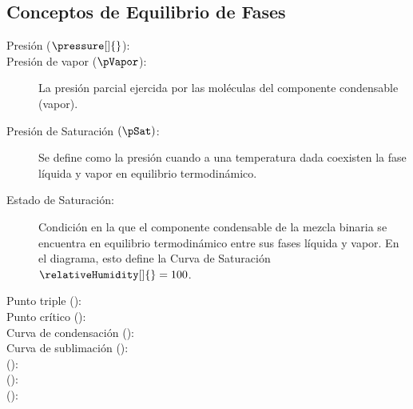 \subsection{Conceptos de Equilibrio de Fases}
    \begin{description}
        \item[Presión (${\pressure[]{}}$):] 
        \item[Presión de vapor ($\pVapor$):] La presión parcial ejercida por las moléculas del componente condensable (vapor).
        \item[Presión de Saturación $(\pSat)$:] Se define como la presión cuando a una temperatura dada coexisten la fase líquida y vapor en equilibrio termodinámico. 
        \item[Estado de Saturación:] Condición en la que el componente condensable de la mezcla binaria se encuentra en equilibrio termodinámico entre sus fases líquida y vapor. En el diagrama, esto define la Curva de Saturación $\relativeHumidity[]{} = 100$. 
        \item[Punto triple (${}$):]
        \item[Punto crítico (${}$):]
        \item[Curva de condensación (${}$):]
        \item[Curva de sublimación (${}$):]
        \item[ (${}$):]
        \item[ (${}$):]
        \item[ (${}$):]
    \end{description}



